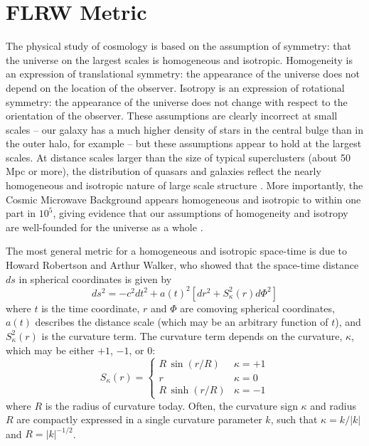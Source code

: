 \section{FLRW Metric}
\label{sec:FLRW}
The physical study of cosmology is based on the assumption of symmetry:
that the universe on the largest scales is homogeneous and isotropic.
Homogeneity is an expression of translational symmetry: the appearance of
the universe does not depend on the location of the observer.  Isotropy
is an expression of rotational symmetry: the appearance of the universe
does not change with respect to the orientation of the observer.
These assumptions are clearly incorrect at small scales -- our galaxy
has a much higher density of stars in the central bulge than in the
outer halo, for example -- but these assumptions appear to hold at
the largest scales.
At distance scales larger than the size of typical superclusters
(about 50 Mpc or more), the distribution of
quasars and galaxies reflect the nearly homogeneous and isotropic
nature of large scale structure \citep{Yadav2005, Sarkar2009}.
More importantly, the Cosmic Microwave
Background appears homogeneous and isotropic to within one part in
$10^5$, giving evidence that our assumptions of homogeneity and isotropy
are well-founded for the universe as a whole \citep[For an interesting
discussion of the limits of this approach, see][]{Maartens2011}.

The most general metric for a homogeneous and isotropic space-time is due
to Howard Robertson and Arthur Walker, who showed that the space-time
distance $ds$ in spherical coordinates is given by
\begin{equation}
  \label{eq:FLRW_metric}
  ds^2 = -c^2 dt^2 + a(t)^2\left[dr^2 + S_\kappa^2(r)d\Phi^2\right]
\end{equation}
where $t$ is the time coordinate, $r$ and $\Phi$ are comoving spherical
coordinates,
$a(t)$ describes the distance scale (which may be an arbitrary function
of $t$), and $S_\kappa^2(r)$ is the curvature term.  The curvature term
depends on the curvature, $\kappa$, which may be either $+1$, $-1$, or $0$:
\begin{equation}
  \label{eq:FLRW_curvature}
  S_\kappa(r) = \left\{
  \begin{array}{ll}
    R\,\sin(r/R) & \kappa = +1\\
    r & \kappa = 0\\
    R\,\sinh(r/R) & \kappa = -1
  \end{array}
  \right.
\end{equation}
where $R$ is the radius of curvature today.  Often, the curvature
sign $\kappa$ and radius $R$ are compactly expressed in a single curvature
parameter $k$, such that $\kappa = k/|k|$ and $R = |k|^{-1/2}$.

